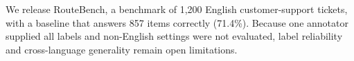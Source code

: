 We release RouteBench, a benchmark of 1,200 English customer-support tickets, with a baseline that answers 857 items correctly (71.4\%). Because one annotator supplied all labels and non-English settings were not evaluated, label reliability and cross-language generality remain open limitations.
